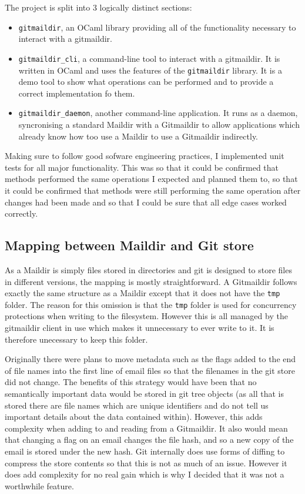 The project is split into 3 logically distinct sections:
\begin{itemize}
  \item \texttt{gitmaildir}, an OCaml library providing all of the functionality necessary to interact with a gitmaildir.
  \item \texttt{gitmaildir\_cli}, a command-line tool to interact with a gitmaildir. It is written in OCaml and uses the features of the \texttt{gitmaildir} library. It is a demo tool to show what operations can be performed and to provide a correct implementation fo them.
  \item \texttt{gitmaildir\_daemon}, another command-line application. It runs as a daemon, syncronising a standard Maildir with a Gitmaildir to allow applications which already know how too use a Maildir to use a Gitmaildir indirectly.
\end{itemize}

Making sure to follow good sofware engineering practices, I implemented unit tests for all major functionality. This was so that it could be confirmed that methods performed the same operations I expected and planned them to, so that it could be confirmed that methods were still performing the same operation after changes had been made and so that I could be sure that all edge cases worked correctly.

\subsection{Mapping between Maildir and Git store}

As a Maildir is simply files stored in directories and git is designed to store files in different versions, the mapping is mostly straightforward. A Gitmaildir follows exactly the same structure as a Maildir except that it does not have the \texttt{tmp} folder. The reason for this omission is that the \texttt{tmp} folder is used for concurrency protections when writing to the filesystem. However this is all managed by the gitmaildir client in use which makes it unnecessary to ever write to it. It is therefore unecessary to keep this folder.

Originally there were plans to move metadata such as the flags added to the end of file names into the first line of email files so that the filenames in the git store did not change. The benefits of this strategy would have been that no semantically important data would be stored in git tree objects (as all that is stored there are file names which are unique identifiers and do not tell us important details about the data contained within). However, this adds complexity when adding to and reading from a Gitmaildir. It also would mean that changing a flag on an email changes the file hash, and so a new copy of the email is stored under the new hash. Git internally does use forms of diffing to compress the store contents so that this is not as much of an issue. However it does add complexity for no real gain which is why I decided that it was not a worthwhile feature.

